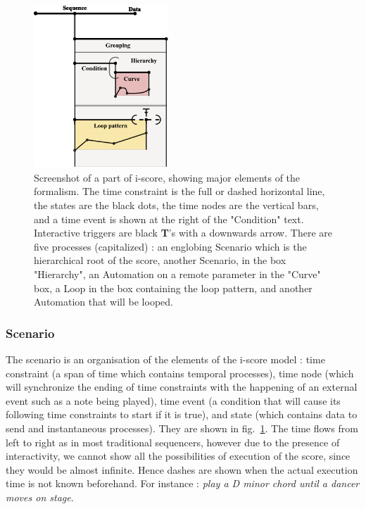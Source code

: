 \documentclass{article}
\begin{document}
\begin{figure}
    \includegraphics[width=0.45\textwidth]{images/hierarchy.eps}
    \caption{Screenshot of a part of i-score, showing major elements of the formalism. The time constraint is the full or dashed horizontal line, the states are the black dots, the time nodes are the vertical bars, and a time event is shown at the right of the "Condition" text. Interactive triggers are black \textbf{T}'s with a downwards arrow. There are five processes (capitalized) : an englobing Scenario which is the hierarchical root of the score, another Scenario, in the box "Hierarchy", an Automation on a remote parameter in the "Curve" box, a Loop in the box containing the loop pattern, and another Automation that will be looped.}
    \label{fig.hierarchy}
\end{figure}
\subsubsection{Scenario}
The scenario is an organisation of the elements of the i-score model : time constraint (a span of time which contains temporal processes), time node (which will synchronize the ending of time constraints with the happening of an external event such as a note being played), time event (a condition that will cause its following time constraints to start if it is true), and state (which contains data to send and instantaneous processes).
They are shown in fig.~\ref{fig.hierarchy}. 
The time flows from left to right as in most traditional sequencers, however due to the presence of interactivity, we cannot show all the possibilities of execution of the score, since they would be almost infinite. 
Hence dashes are shown when the actual execution time is not known beforehand. 
For instance : \emph{play a D minor chord until a dancer moves on stage}.
\end{document}
